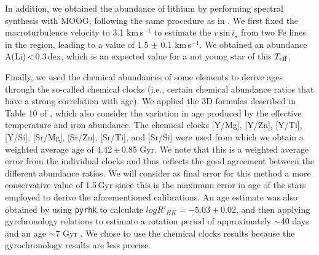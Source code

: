 \documentclass[fleqn,usenatbib,useAMS]{mnras}
\begin{document}
In addition, we obtained the abundance of lithium by performing spectral synthesis with MOOG, following the same procedure as in \citet{DelgadoMena-14}. We first fixed the macroturbulence velocity to 3.1 km\,s$^{-1}$ \citep[based on the empirical calibration by][]{doyle-14} to estimate the $v \, \textrm{sin} \, i_{\star}$ from two Fe lines in the region, leading to a value of 1.5 $\pm$ 0.1 km\,s$^{-1}$. We obtained an abundance A(Li)\,<\,0.3\,dex, which is an expected value for a not young star of this $T_{\rm eff}$. 

Finally, we used the chemical abundances of some elements to derive ages through the so-called chemical clocks (i.e., certain chemical abundance ratios that have a strong correlation with age). We applied the 3D formulas described in Table 10 of \citet{DelgadoMena-19}, which also consider the variation in age produced by the effective temperature and iron abundance. The chemical clocks [Y/Mg], [Y/Zn], [Y/Ti], [Y/Si], [Sr/Mg], [Sr/Zn], [Sr/Ti], and [Sr/Si] were used from which we obtain a weighted average age of 4.42\,$\pm$\,0.85 Gyr. We note that this is a weighted average error from the individual clocks and thus reflects the good agreement between the different abundance ratios. We will consider as final error for this method a more conservative value of 1.5\,Gyr since this is the maximum error in age of the stars employed to derive the aforementioned calibrations. An age estimate was also obtained by using \texttt{pyrhk} \citep{Silva2019} to calculate $logR'_{HK}=-5.03\pm0.02$, and then applying gyrchronology relations to estimate a rotation period of approximately $\sim$40 days and an age $\sim$7 Gyr \citep{Mamajek2008}. We chose to use the chemical clocks results because the gyrochronology results are less precise.
\end{document}

